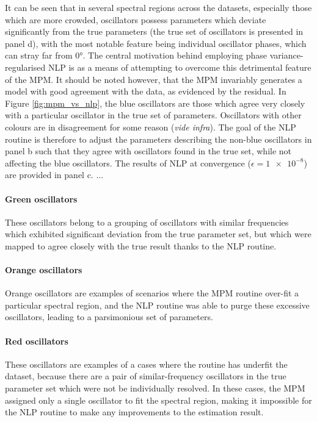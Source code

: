 It can be seen that in several spectral regions across the datasets, especially
those which are more crowded, oscillators possess parameters which deviate
significantly from the true parameters (the true set of oscillators is
presented in panel d), with the most notable feature being individual
oscillator phases, which can stray far from \ang{0}.
The central motivation behind employing phase variance-regularised \ac{NLP} is
as a means of attempting to overcome this detrimental feature of the \ac{MPM}.
It should be noted however, that the \ac{MPM} invariably generates a model with
good agreement with the data, as evidenced by the residual.
In Figure \ref{fig:mpm_vs_nlp}, the blue oscillators are those which agree very
closely with a particular oscillator in the true set of parameters. Oscillators
with other colours are in disagreement for some reason (\textit{vide infra}).
The goal of the \ac{NLP} routine is therefore to adjust the parameters
describing the non-blue oscillators in panel b such that they agree with
oscillators found in the true set, while not affecting the blue oscillators.
The results of \ac{NLP} at convergence ($\epsilon = \num{1e-8}$) are provided
in panel c. ...


\paragraph{Green oscillators}
These oscillators belong to a grouping of oscillators with similar frequencies
which exhibited significant deviation from the true parameter set, but which
were mapped to agree closely with the true result thanks to the \ac{NLP}
routine.

\paragraph{Orange oscillators}
Orange oscillators are examples of scenarios where the \ac{MPM} routine
over-fit a particular spectral region, and the \ac{NLP} routine was able to
purge these excessive oscillators, leading to a parsimonious set of parameters.

\paragraph{Red oscillators}
These oscillators are examples of a cases where the routine has underfit the
dataset, because there are a pair of similar-frequency oscillators in the true
parameter set which were not be individually resolved. In these cases, the
\ac{MPM} assigned only a single oscillator to fit the spectral region, making
it impossible for the \ac{NLP} routine to make any improvements to the
estimation result.

